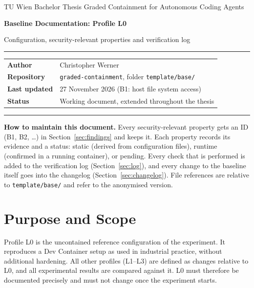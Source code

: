 \documentclass[11pt,a4paper]{article}
\newcommand{\stStatic}{\textsf{\small static}}
\newcommand{\stRuntime}{\textsf{\small runtime}}
\newcommand{\stPending}{\textsf{\small\color{todo} pending}}
\newcommand{\fpath}[1]{\texttt{#1}}
\begin{document}
\thispagestyle{plain}
{\sffamily\footnotesize\color{muted}TU Wien \textbullet{} Bachelor Thesis \textbullet{} Graded Containment for Autonomous Coding Agents}

\vspace{1.2em}
{\sffamily\LARGE\bfseries Baseline Documentation: Profile L0}

\vspace{0.3em}
{\sffamily\large Configuration, security-relevant properties and verification log}

\vspace{1em}
{\color{tuaccent}\rule{\linewidth}{1pt}}

\vspace{0.2em}
\begin{tabular}{@{}ll}
\textbf{Author} & Christopher Werner \\
\textbf{Repository} & \texttt{graded-containment}, folder \fpath{template/base/} \\
\textbf{Last updated} & 27 November 2026 (B1: host file system access) \\
\textbf{Status} & Working document, extended throughout the thesis \\
\end{tabular}

\vspace{0.6em}
{\color{tuaccent}\rule{\linewidth}{0.4pt}}

\textbf{How to maintain this document.} Every security-relevant property gets an ID (B1, B2, \dots) in Section~\ref{sec:findings} and keeps it. Each property records its evidence and a status: \stStatic{} (derived from configuration files), \stRuntime{} (confirmed in a running container), or \stPending{}. Every check that is performed is added to the verification log (Section~\ref{sec:log}), and every change to the baseline itself goes into the changelog (Section~\ref{sec:changelog}). File references are relative to \fpath{template/base/} and refer to the anonymised version.

\section{Purpose and Scope}

Profile L0 is the uncontained reference configuration of the experiment. It reproduces a Dev Container setup as used in industrial practice, without additional hardening. All other profiles (L1--L3) are defined as changes relative to L0, and all experimental results are compared against it. L0 must therefore be documented precisely and must not change once the experiment starts.
\end{document}
